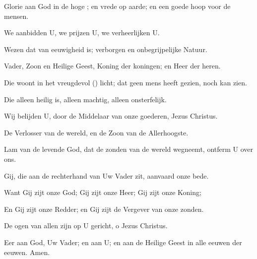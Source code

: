 \documentclass[12pt,twoside,a5paper]{article}
\begin{document}


Glorie aan God in de hoge ; en vrede op aarde; en een goede hoop voor de mensen.

\begin{halfparskip}
  We aanbidden U, we prijzen U, we verheerlijken U.

  Wezen dat van eeuwigheid is; verborgen en onbegrijpelijke Natuur.

  Vader, Zoon en Heilige Geest, Koning der koningen; en Heer der heren.

  Die woont in het vreugdevol () licht; dat geen mens heeft gezien, noch kan zien.

  Die alleen heilig is, alleen machtig, alleen onsterfelijk.

  Wij belijden U, door de Middelaar van onze goederen, Jezus Christus.

  De Verlosser van de wereld, en de Zoon van de Allerhoogste.

  Lam van de levende God, dat de zonden van de wereld wegneemt, ontferm U over ons.

  Gij, die aan de rechterhand van Uw Vader zit, aanvaard onze bede.

  Want Gij zijt onze God; Gij zijt onze Heer; Gij zijt onze Koning;

  En Gij zijt onze Redder; en Gij zijt de Vergever van onze zonden.

  De ogen van allen zijn op U gericht, o Jezus Christus.

  Eer aan God, Uw Vader; en aan U; en aan de Heilige Geest in alle eeuwen der eeuwen. Amen.
\end{halfparskip}
\end{document}
